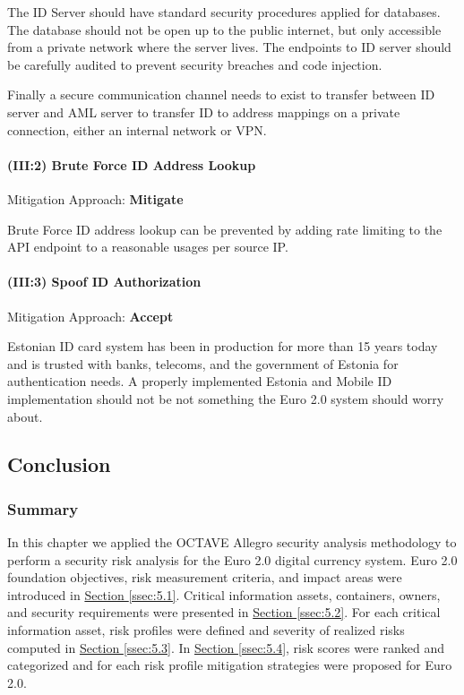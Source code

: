 \documentclass[a4paper,12pt]{article} %
\newcommand{\hypersectionref}[1]{\hyperref[#1]{Section \ref{#1}}}
\begin{document}
{The ID Server should have standard security procedures applied for databases. The database should not be open up to the public internet, but only accessible from a private network where the server lives. The endpoints to ID server should be carefully audited to prevent security breaches and code injection.

Finally a secure communication channel needs to exist to transfer between ID server and AML server to transfer ID to address mappings on a private connection, either an internal network or VPN.

\paragraph{(III:2) Brute Force ID Address Lookup}

Mitigation Approach: \textbf{Mitigate}

Brute Force ID address lookup can be prevented by adding rate limiting to the API endpoint to a reasonable usages per source IP.

\paragraph{(III:3) Spoof ID Authorization}

Mitigation Approach: \textbf{Accept}

Estonian ID card system has been in production for more than 15 years today and is trusted with banks, telecoms, and the government of Estonia for authentication needs\cite{Martens2010electronicIdentity}. A properly implemented Estonia and Mobile ID implementation should not be not something the Euro 2.0 system should worry about.

\subsection{Conclusion} \label{ssec:5.5}

\subsubsection{Summary} \label{ssec:5.5:summary}
In this chapter we applied the OCTAVE Allegro security analysis methodology\cite{CaralliIntroducingOCTAVE2007} to perform a security risk analysis for the Euro 2.0 digital currency system. Euro 2.0 foundation objectives, risk measurement criteria, and impact areas were introduced in \hypersectionref{ssec:5.1}. Critical information assets, containers, owners, and security requirements were presented in \hypersectionref{ssec:5.2}. For each critical information asset, risk profiles were defined and severity of realized risks computed in \hypersectionref{ssec:5.3}. In \hypersectionref{ssec:5.4}, risk scores were ranked and categorized and for each  risk profile mitigation strategies were proposed for Euro 2.0.

}
\end{document}
